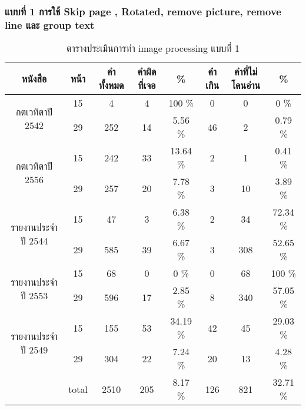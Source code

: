 \subsubsection{แบบที่ 1 การใช้ Skip page , Rotated, remove picture, remove line และ group text}
\begin{table}[H]
    \caption{ตารางประเมินการทำ image processing แบบที่ 1 }\label{tbl:imagep1}
    \begin{tabular}{|c|c|c|c|c|c|c|c|}
        \hline
        หนังสือ                             & หน้า  & คำทั้งหมด & คำผิดที่เจอ & \%    & คำเกิน & คำที่ไม่โดนอ่าน & \%    \\ \hline
        \multirow{2}{*}{กตเวทิตาปี 2542}    & 15    & 4         & 4           & 100 \%  & 0      & 0               & 0 \%    \\ \cline{2-8} 
                                            & 29    & 252       & 14          & 5.56 \%  & 46     & 2               & 0.79 \% \\ \hline
        \multirow{2}{*}{กตเวทิตาปี 2556}    & 15    & 242       & 33          & 13.64 \% & 2      & 1               & 0.41 \% \\ \cline{2-8} 
                                            & 29    & 257       & 20          & 7.78 \% & 3      & 10              & 3.89 \% \\ \hline
        \multirow{2}{*}{รายงานประจำปี 2544} & 15    & 47        & 3           & 6.38 \% & 2      & 34              & 72.34 \% \\ \cline{2-8} 
                                            & 29    & 585       & 39          & 6.67 \% & 3      & 308             & 52.65 \% \\ \hline
        \multirow{2}{*}{รายงานประจำปี 2553} & 15    & 68        & 0           & 0 \%    & 0      & 68              & 100 \%  \\ \cline{2-8} 
                                            & 29    & 596       & 17          & 2.85 \% & 8      & 340             & 57.05 \% \\ \hline
        \multirow{2}{*}{รายงานประจำปี 2549} & 15    & 155       & 53          & 34.19 \% & 42     & 45              & 29.03 \% \\ \cline{2-8} 
                                            & 29    & 304       & 22          & 7.24 \% & 20     & 13              & 4.28 \%\\ \hline
        \multicolumn{1}{|l|}{}              & total & 2510      & 205         & 8.17 \% & 126    & 821             & 32.71 \% \\ \hline
        \end{tabular}
        \end{table}

